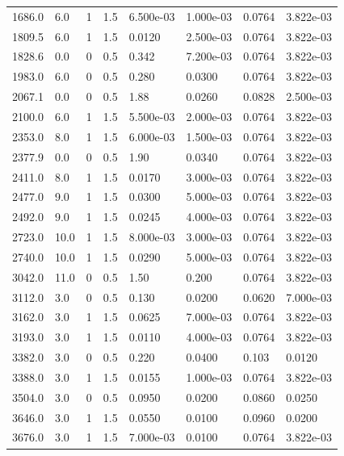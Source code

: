 \documentclass[preview]{standalone}
\begin{document}
{{\begin{tabular}{L{1.2cm}C{1.2cm} C{0.3cm}C{0.5cm} C{1.4cm}C{1.4cm} C{1.4cm}C{1.4cm}}
  1686.0  &   6.0  & 1     & 1.5 &  6.500e-03  & 1.000e-03  & 0.0764 &  3.822e-03   \\ 
  1809.5  &   6.0  & 1     & 1.5 &  0.0120  & 2.500e-03  & 0.0764 &  3.822e-03   \\ 
  1828.6  &   0.0  & 0     & 0.5 &  0.342  & 7.200e-03  & 0.0764 &  3.822e-03   \\ 
  1983.0  &   6.0  & 0     & 0.5 &  0.280  & 0.0300  & 0.0764 &  3.822e-03   \\ 
  2067.1  &   0.0  & 0     & 0.5 &  1.88  & 0.0260  & 0.0828 &  2.500e-03   \\ 
  2100.0  &   6.0  & 1     & 1.5 &  5.500e-03  & 2.000e-03  & 0.0764 &  3.822e-03   \\ 
  2353.0  &   8.0  & 1     & 1.5 &  6.000e-03  & 1.500e-03  & 0.0764 &  3.822e-03   \\ 
  2377.9  &   0.0  & 0     & 0.5 &  1.90  & 0.0340  & 0.0764 &  3.822e-03   \\ 
  2411.0  &   8.0  & 1     & 1.5 &  0.0170  & 3.000e-03  & 0.0764 &  3.822e-03   \\ 
  2477.0  &   9.0  & 1     & 1.5 &  0.0300  & 5.000e-03  & 0.0764 &  3.822e-03   \\ 
  2492.0  &   9.0  & 1     & 1.5 &  0.0245  & 4.000e-03  & 0.0764 &  3.822e-03   \\ 
  2723.0  &  10.0  & 1     & 1.5 &  8.000e-03  & 3.000e-03  & 0.0764 &  3.822e-03   \\ 
  2740.0  &  10.0  & 1     & 1.5 &  0.0290  & 5.000e-03  & 0.0764 &  3.822e-03   \\ 
  3042.0  &  11.0  & 0     & 0.5 &  1.50  & 0.200  & 0.0764 &  3.822e-03   \\ 
  3112.0  &   3.0  & 0     & 0.5 &  0.130  & 0.0200  & 0.0620 &  7.000e-03   \\ 
  3162.0  &   3.0  & 1     & 1.5 &  0.0625  & 7.000e-03  & 0.0764 &  3.822e-03   \\ 
  3193.0  &   3.0  & 1     & 1.5 &  0.0110  & 4.000e-03  & 0.0764 &  3.822e-03   \\ 
  3382.0  &   3.0  & 0     & 0.5 &  0.220  & 0.0400  & 0.103 &  0.0120   \\ 
  3388.0  &   3.0  & 1     & 1.5 &  0.0155  & 1.000e-03  & 0.0764 &  3.822e-03   \\ 
  3504.0  &   3.0  & 0     & 0.5 &  0.0950  & 0.0200  & 0.0860 &  0.0250   \\ 
  3646.0  &   3.0  & 1     & 1.5 &  0.0550  & 0.0100  & 0.0960 &  0.0200   \\ 
  3676.0  &   3.0  & 1     & 1.5 &  7.000e-03  & 0.0100  & 0.0764 &  3.822e-03   \\ 

\end{tabular}}}
\end{document}
